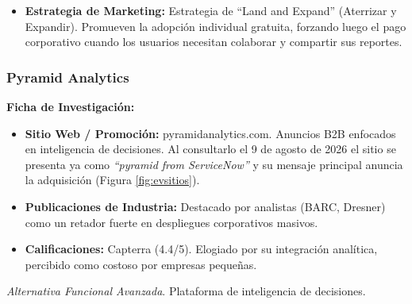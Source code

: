 \begin{itemize}
    \item \textbf{Estrategia de Marketing:} Estrategia de ``Land and Expand'' (Aterrizar y Expandir). Promueven la adopción individual gratuita, forzando luego el pago corporativo cuando los usuarios necesitan colaborar y compartir sus reportes.
\end{itemize}

\clearpage
\subsubsection{Pyramid Analytics}

\textbf{Ficha de Investigación:}
\begin{itemize}
    \item \textbf{Sitio Web / Promoción:} pyramidanalytics.com. Anuncios B2B enfocados en inteligencia de decisiones. Al consultarlo el 9 de agosto de 2026 el sitio se presenta ya como \textit{``pyramid from ServiceNow''} y su mensaje principal anuncia la adquisición (Figura \ref{fig:evsitios}).
    \item \textbf{Publicaciones de Industria:} Destacado por analistas (BARC, Dresner) como un retador fuerte en despliegues corporativos masivos.
    \item \textbf{Calificaciones:} Capterra (4.4/5). Elogiado por su integración analítica, percibido como costoso por empresas pequeñas.
\end{itemize}
\vspace{0.35cm}

\textit{Alternativa Funcional Avanzada}. Plataforma de inteligencia de decisiones.

